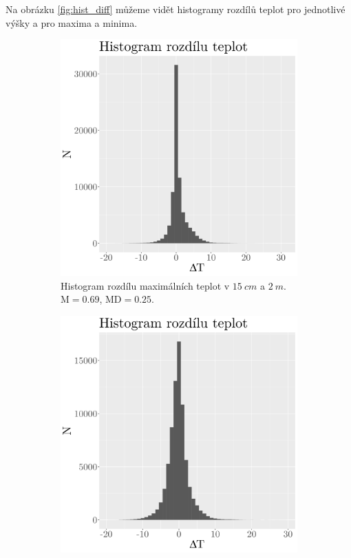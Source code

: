 Na obrázku \ref{fig:hist_diff} můžeme vidět histogramy rozdílů teplot pro jednotlivé výšky a pro maxima a minima.

\begin{figure}
	\centering
	\begin{subfigure}{0.45\textwidth}
  \includegraphics[width=\textwidth]{img/ch2/hist_diff_max15cm.png}
		\caption{Histogram rozdílu maximálních teplot v $\SI{15}{cm}$ a $\SI{2}{m}$. $\text{M} = 0.69$, $\text{MD} = 0.25$.}
		\label{fig:hist_diff_max15cm}
	\end{subfigure}
	\hfill
	\begin{subfigure}{0.45\textwidth}
  \includegraphics[width=\textwidth]{img/ch2/hist_diff_max0cm.png}

\end{subfigure}
\end{figure}
